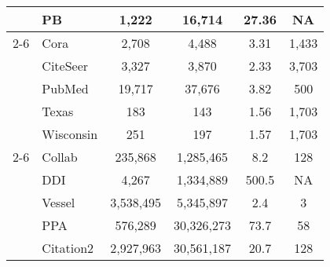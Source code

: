 \documentclass[sigconf, nonacm]{acmart}
\begin{document}
\begin{table}[t]
{\begin{tabular}{llcccc}
                                & \textrm{PB}               & 1,222                                  & 16,714                                 & 27.36                                  & NA                    \\ 
\cmidrule[0.75pt](r){2-6}
\multirow{4}{*}{\begin{sideways}{\scriptsize Attributed}\end{sideways}}     & \textrm{Cora}             & 2,708                                  & 4,488                                  & 3.31                                   & 1,433                  \\
                                & \textrm{CiteSeer}         & 3,327                                  & 3,870                                  & 2.33                                   & 3,703                  \\
                                & \textrm{PubMed}           & 19,717                                 & 37,676                                & 3.82                                   & 500                   \\
                                & \textrm{Texas}        & 183                                   & 143                                   & 1.56                                   & 1,703                  \\ 
                                & \textrm{Wisconsin}        & 251                                   & 197                                   & 1.57                                   & 1,703                  \\ 
\cmidrule[0.75pt](r){2-6}
\multirow{4}{*}{\begin{sideways}{\scriptsize OGB}\end{sideways}}            & \textrm{Collab}           & 235,868                                & 1,285,465                               & 8.2                                     & 128                   \\
& \textrm{DDI}           & 4,267                                & 1,334,889                               & 500.5                                     & NA                   \\
                                & \textrm{Vessel}           & 3,538,495                               & 5,345,897                               & 2.4                                   & 3                     \\
                                & \textrm{PPA}           &      576,289                          & 30,326,273 	                               & 73.7                                    & 58                     \\
                                & \textrm{Citation2}           & 2,927,963                               & 30,561,187                               & 20.7                                   & 128                     \\
\bottomrule
\end{tabular}


}
\end{table}
\end{document}
